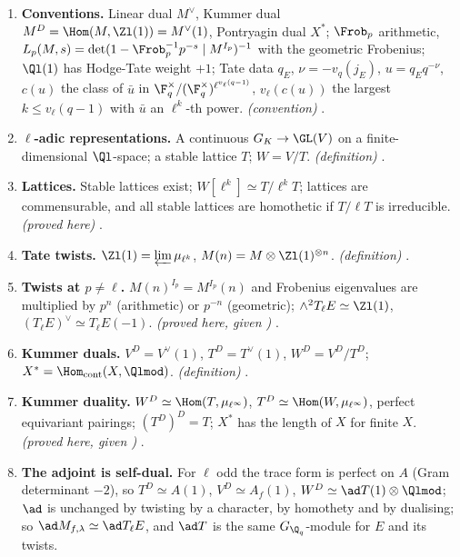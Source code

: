 \begin{enumerate}[label=\textbf{\thechapter.\arabic*}]
\item \textbf{Conventions.} Linear dual $M^\vee$, Kummer dual $M^D=\Hom(M,\Zl(1))=M^\vee(1)$, Pontryagin dual $X^*$; $\Frob_p$ arithmetic, $L_p(M,s)=\det(1-\Frob_p^{-1}p^{-s}\mid M^{I_p})^{-1}$
with the geometric Frobenius; $\Ql(1)$ has Hodge-Tate weight $+1$; Tate data $q_E$, $\nu=-v_q(j_E)$, $u=q_Eq^{-\nu}$, $c(u)$ the class of $\bar u$ in $\F_q^\times/(\F_q^\times)^{\ell^{v_\ell(q-1)}}$, $v_\ell(c(u))$ the
largest $k\le v_\ell(q-1)$ with $\bar u$ an $\ell^k$-th power. \emph{(convention)} .
\item \textbf{$\ell$-adic representations.} A continuous $G_K\to\GL(V)$ on a finite-dimensional $\Ql$-space; a stable lattice $T$; $W=V/T$. \emph{(definition)}
.
\item \textbf{Lattices.} Stable lattices exist; $W[\ell^k]\simeq T/\ell^kT$; lattices are commensurable, and all stable lattices are homothetic if $T/\ell T$ is irreducible. \emph{(proved
here)} .
\item \textbf{Tate twists.} $\Zl(1)=\varprojlim\mu_{\ell^k}$, $M(n)=M\otimes\Zl(1)^{\otimes n}$. \emph{(definition)} .
\item \textbf{Twists at $p\ne\ell$.} $M(n)^{I_p}=M^{I_p}(n)$ and Frobenius eigenvalues are multiplied by $p^n$ (arithmetic) or $p^{-n}$ (geometric); $\wedge^2T_\ell E\simeq\Zl(1)$, $(T_\ell E)^\vee\simeq T_\ell E(-1)$.
\emph{(proved here, given )} .
\item \textbf{Kummer duals.} $V^D=V^\vee(1)$, $T^D=T^\vee(1)$, $W^D=V^D/T^D$; $X^*=\Hom_{\mathrm{cont}}(X,\Qlmod)$. \emph{(definition)} .
\item \textbf{Kummer duality.} $W^D\simeq\Hom(T,\mu_{\ell^\infty})$, $T^D\simeq\Hom(W,\mu_{\ell^\infty})$, perfect equivariant pairings; $(T^D)^D=T$; $X^*$ has the length of $X$ for finite $X$.
\emph{(proved here, given )} .
\item \textbf{The adjoint is self-dual.} For $\ell$ odd the trace form is perfect on $A$ (Gram determinant $-2$), so $T^D\simeq A(1)$, $V^D\simeq A_f(1)$, $W^D\simeq\ad T(1)\otimes\Qlmod$;
$\ad$ is unchanged by twisting by a character, by homothety and by dualising; so $\ad M_{f,\lambda}\simeq\ad T_\ell E$, and $\ad T$ is the same $G_{\Q_q}$-module for $E$ and its twists.

\end{enumerate}

